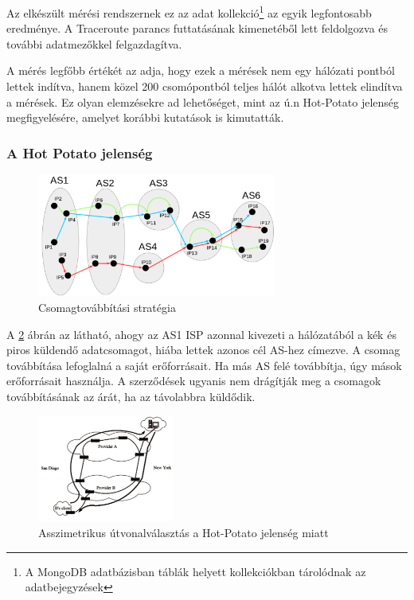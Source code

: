 Az elkészült mérési rendszernek ez az adat kollekció\footnote{A MongoDB adatbázisban táblák helyett kollekciókban tárolódnak az adatbejegyzések} az egyik legfontosabb eredménye. A Traceroute parancs futtatásának kimenetéből lett feldolgozva\cite{traceParse} és további adatmezőkkel felgazdagítva.

A mérés legfőbb értékét az adja, hogy ezek a mérések nem egy hálózati pontból lettek indítva, hanem közel 200 csomópontból teljes hálót alkotva lettek elindítva a mérések. Ez olyan elemzésekre ad lehetőséget, mint az ú.n Hot-Potato jelenség megfigyelésére, amelyet korábbi kutatások is kimutatták\cite{hot-potato}.

\subsubsection*{A Hot Potato jelenség}

\begin{figure}[!ht]
	\centering
	\includegraphics[width=0.7\textwidth, keepaspectratio]{figures/hot-potato.PNG}
	\caption{Csomagtovábbítási stratégia}
	\label{fig:hot-potato}
\end{figure}

A \ref{fig:hot-potato} ábrán az látható, ahogy az AS1 ISP azonnal kivezeti a hálózatából a kék és piros küldendő adatcsomagot, hiába lettek azonos cél AS-hez címezve. A csomag továbbítása lefoglalná a saját erőforrásait. Ha más AS felé továbbítja, úgy mások erőforrásait használja. A szerződések ugyanis nem drágítják meg a csomagok továbbításának az árát, ha az távolabbra küldődik.

\begin{figure}[!ht]
	\centering
	\includegraphics[width=0.4\textwidth, keepaspectratio]{figures/asymetric.PNG}
	\caption{Asszimetrikus útvonalválasztás a Hot-Potato jelenség miatt\protect\footnotemark}
	\label{fig:hot-potato}
\end{figure}

